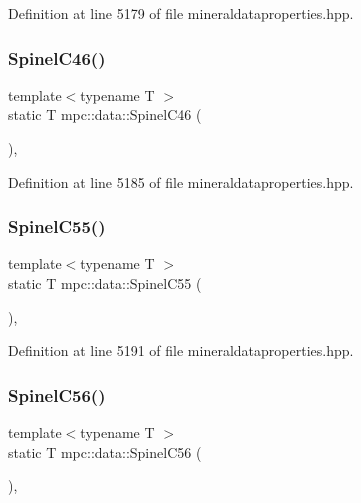 Definition at line 5179 of file mineraldataproperties.\+hpp.

\mbox{\label{namespacempc_1_1data_a100e923e0bd8293bb81fecdedd9bb1e4}} 
\subsubsection{\texorpdfstring{Spinel\+C46()}{SpinelC46()}}
{\footnotesize\ttfamily template$<$typename T $>$ \\
static T mpc\+::data\+::\+Spinel\+C46 (\begin{DoxyParamCaption}{ }\end{DoxyParamCaption})\hspace{0.3cm}{\ttfamily [inline]}, {\ttfamily [static]}}



Definition at line 5185 of file mineraldataproperties.\+hpp.

\mbox{\label{namespacempc_1_1data_acf1f5d1fc2c2031908152bdabbb81f78}} 
\subsubsection{\texorpdfstring{Spinel\+C55()}{SpinelC55()}}
{\footnotesize\ttfamily template$<$typename T $>$ \\
static T mpc\+::data\+::\+Spinel\+C55 (\begin{DoxyParamCaption}{ }\end{DoxyParamCaption})\hspace{0.3cm}{\ttfamily [inline]}, {\ttfamily [static]}}



Definition at line 5191 of file mineraldataproperties.\+hpp.

\mbox{\label{namespacempc_1_1data_acc7105a060f78acd37bbc0fc200ef65e}} 
\subsubsection{\texorpdfstring{Spinel\+C56()}{SpinelC56()}}
{\footnotesize\ttfamily template$<$typename T $>$ \\
static T mpc\+::data\+::\+Spinel\+C56 (\begin{DoxyParamCaption}{ }\end{DoxyParamCaption})\hspace{0.3cm}{\ttfamily [inline]}, {\ttfamily [static]}}



